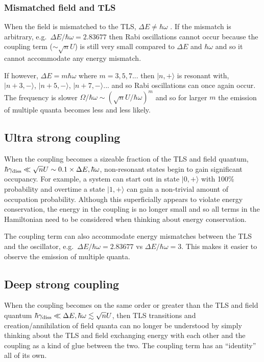 \documentclass[
]{article}
\renewcommand{\[}{\begin{equation}}
\renewcommand{\]}{\end{equation}}
\begin{document}
\subsubsection{Mismatched field and TLS}\label{mismatched-field-and-tls}

When the field is mismatched to the TLS, \(\Delta E \neq \hbar\omega\) .
If the mismatch is arbitrary, e.g.~\(\Delta E/ \hbar\omega = 2.83677\)
then Rabi oscillations cannot occur because the coupling term
(\(\sim \sqrt{n}U\)) is still very small compared to \(\Delta E\) and
\(\hbar\omega\) and so it cannot accommodate any energy mismatch.

If however, \(\Delta E = m\hbar \omega\) where \(m=3, 5, 7 ...\) then
\(|n,+\rangle\) is resonant with, \(|n+3,-\rangle\), \(|n+5,-\rangle\),
\(|n+7,-\rangle ...\) and so Rabi oscillations can once again occur. The
frequency is slower
\(\Omega/\hbar\omega \sim (\sqrt{n}U/\hbar\omega)^m\) and so for larger
\(m\) the emission of multiple quanta becomes less and less likely.

\subsection{Ultra strong coupling}\label{ultra-strong-coupling-1}

When the coupling becomes a sizeable fraction of the TLS and field
quantum,
\(\hbar\gamma_{\rm diss} \ll \sqrt{n}U \sim 0.1 \times \Delta E , \hbar \omega\),
non-resonant states begin to gain significant occupancy. For example, a
system can start out in state \(|0,+\rangle\) with 100\% probability and
overtime a state \(|1,+\rangle\) can gain a non-trivial amount of
occupation probability. Although this superficially appears to violate
energy conservation, the energy in the coupling is no longer small and
so all terms in the Hamiltonian need to be considered when thinking
about energy conservation.

The coupling term can also accommodate energy mismatches between the TLS
and the oscillator, e.g.~\(\Delta E/ \hbar\omega = 2.83677\) vs
\(\Delta E/ \hbar\omega = 3\). This makes it easier to observe the
emission of multiple quanta.

\subsection{Deep strong coupling}\label{deep-strong-coupling-1}

When the coupling becomes on the same order or greater than the TLS and
field quantum
\(\hbar\gamma_{\rm diss} \ll \Delta E , \hbar \omega \lesssim \sqrt{n}U\),
then TLS transitions and creation/annihilation of field quanta can no
longer be understood by simply thinking about the TLS and field
exchanging energy with each other and the coupling as a kind of glue
between the two. The coupling term has an ``identity'' all of its own.
\end{document}
